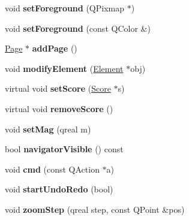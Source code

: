 \begin{DoxyCompactItemize}
void {\bfseries set\+Foreground} (Q\+Pixmap $\ast$)
\item 
\mbox{\label{class_ms_1_1_score_view_a1d87f748437d85b45e7439481b3daf8e}} 
void {\bfseries set\+Foreground} (const Q\+Color \&)
\item 
\mbox{\label{class_ms_1_1_score_view_a14b6e05b3c148477d6d5209902d104a6}} 
\hyperlink{class_ms_1_1_page}{Page} $\ast$ {\bfseries add\+Page} ()
\item 
\mbox{\label{class_ms_1_1_score_view_a476aa35c84856f9715bb1be084bc9138}} 
void {\bfseries modify\+Element} (\hyperlink{class_ms_1_1_element}{Element} $\ast$obj)
\item 
\mbox{\label{class_ms_1_1_score_view_ac75eee40bd733a74052c81b23378ccf3}} 
virtual void {\bfseries set\+Score} (\hyperlink{class_ms_1_1_score}{Score} $\ast$s)
\item 
\mbox{\label{class_ms_1_1_score_view_a9607ba47d3223ded047a311e830bdf83}} 
virtual void {\bfseries remove\+Score} ()
\item 
\mbox{\label{class_ms_1_1_score_view_aeb83e62228783f96544bc37a8fd767ac}} 
void {\bfseries set\+Mag} (qreal m)
\item 
\mbox{\label{class_ms_1_1_score_view_a6a4ea7fec7c8be3c2516fb80e21cbf13}} 
bool {\bfseries navigator\+Visible} () const
\item 
\mbox{\label{class_ms_1_1_score_view_a6de4cddf8900bbbf8965a2f5caf75d5f}} 
void {\bfseries cmd} (const Q\+Action $\ast$a)
\item 
\mbox{\label{class_ms_1_1_score_view_a6e1941e17c43a0fc02086b1a0a3dab71}} 
void {\bfseries start\+Undo\+Redo} (bool)
\item 
\mbox{\label{class_ms_1_1_score_view_a975af43eb507d11234d871d1a98b7bca}} 
void {\bfseries zoom\+Step} (qreal step, const Q\+Point \&pos)
\item 
\mbox{\label{class_ms_1_1_score_view_afe448773faab4e74ed602a9e547830f3}} 

\end{DoxyCompactItemize}
